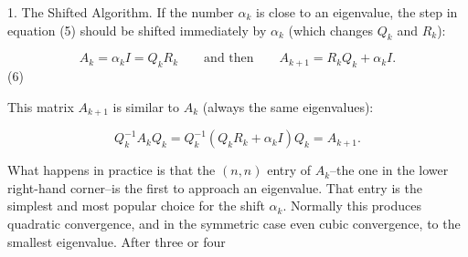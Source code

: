 1. The Shifted Algorithm. If the number \(\alpha_{k}\) is close to an eigenvalue, the step in equation (5) should be shifted immediately by \(\alpha_{k}\) (which changes \(Q_{k}\) and \(R_{k}\)):

\[A_{k}=\alpha_{k}I=Q_{k}R_{k}\qquad\text{and then}\qquad A_{k+1}=R_{k}Q_{k}+ \alpha_{k}I.\] (6)

This matrix \(A_{k+1}\) is similar to \(A_{k}\) (always the same eigenvalues):

\[Q_{k}^{-1}A_{k}Q_{k}=Q_{k}^{-1}(Q_{k}R_{k}+\alpha_{k}I)Q_{k}=A_{k+1}.\]

What happens in practice is that the \((n,n)\) entry of \(A_{k}\)--the one in the lower right-hand corner--is the first to approach an eigenvalue. That entry is the simplest and most popular choice for the shift \(\alpha_{k}\). Normally this produces quadratic convergence, and in the symmetric case even cubic convergence, to the smallest eigenvalue. After three or four 